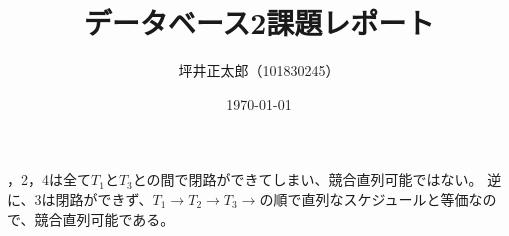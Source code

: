 \documentclass[a4paper,10pt]{jsarticle}
\begin{document}
\title{データベース2課題レポート}
\author{坪井正太郎（101830245）}
\date{\today}
，2，4は全て\(T_1とT_3\)との間で閉路ができてしまい、競合直列可能ではない。
逆に、3は閉路ができず、\(T_1\rightarrow T_2\rightarrow T_3\rightarrow\)の順で直列なスケジュールと等価なので、競合直列可能である。
\end{document}
